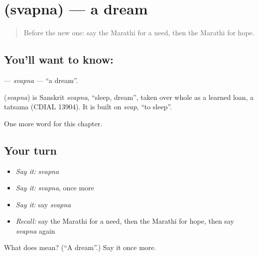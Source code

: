 \section[\texorpdfstring{\mr{स्वप्न} (svapna)}{स्वप्न (svapna)}]{ (svapna) — a dream}

\label{lesson:MR-C123-svapna}



\begin{quote}
Before the new one: say the Marathi for a need, then the Marathi for hope.
\end{quote}

\subsection*{You'll want to know: }
\textbf{} — \emph{svapna} — \textquotedblleft{}a dream\textquotedblright{}.

\begin{cousinweb}
\textbf{} (\emph{svapna}) is Sanskrit \emph{svapna}, \textquotedblleft{}sleep, dream\textquotedblright{}, taken over whole as a learned loan, a tatsama (CDIAL 13904). It is built on \emph{svap}, \textquotedblleft{}to sleep\textquotedblright{}.
\end{cousinweb}

\begin{grammarlens}[title={What you've built}]
One more word for this chapter.
\end{grammarlens}

\subsection*{Your turn}
\begin{itemize}
\raggedright
  \item \emph{Say it:} \emph{svapna}
  \item \emph{Say it:} \emph{svapna}, once more
  \item \emph{Say it:} say \emph{svapna}
  \item \emph{Recall:} say the Marathi for a need, then the Marathi for hope, then say \emph{svapna} again
\end{itemize}

\begin{tcolorbox}[breakable,colback=teal!4,colframe=teal!35!black,title={Before you move on}]
What does  mean? (\textquotedblleft{}A dream\textquotedblright{}.) Say it once more.
\end{tcolorbox}
